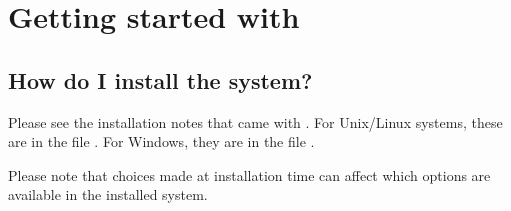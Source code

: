 %
%
%
%
%
%
%
%
%

\newcommand{\guitext}[1]{\mbox{\texttt{#1}}}
\newcommand{\keyboard}[1]{{\texttt{#1}}}
\newcommand{\menu}[1]{\guitext{#1}}
\newcommand{\menuopt}[1]{\guitext{#1}}
\newcommand{\button}[1]{\guitext{#1}}

\newcommand{\ignore}[1]{}

\chapter{Getting started with {\eclipse}}
\label{chapusing}

\section{How do I install the {\eclipse} system?}
Please see the installation notes that came with {\eclipse}.
For Unix/Linux systems, these are in the file .
For Windows, they are in the file .

Please note that choices made at installation time can affect which options
are available in the installed system.

